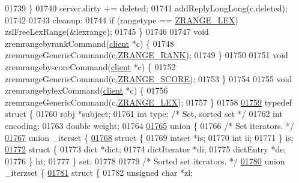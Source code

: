 \begin{DoxyCode}
01739     \}
01740     server.dirty += deleted;
01741     addReplyLongLong(c,deleted);
01742 
01743 cleanup:
01744     \textcolor{keywordflow}{if} (rangetype == \hyperlink{t__zset_8c_a74c64b6c3895c27dc16c15a3c4c590af}{ZRANGE\_LEX}) zslFreeLexRange(&lexrange);
01745 \}
01746 
01747 \textcolor{keywordtype}{void} zremrangebyrankCommand(\hyperlink{structclient}{client} *c) \{
01748     zremrangeGenericCommand(c,\hyperlink{t__zset_8c_a5efcb596b1e5f49647431b38c2c5dde3}{ZRANGE\_RANK});
01749 \}
01750 
01751 \textcolor{keywordtype}{void} zremrangebyscoreCommand(\hyperlink{structclient}{client} *c) \{
01752     zremrangeGenericCommand(c,\hyperlink{t__zset_8c_a0ca38ddc10a38a3b5f6b50e2b25fc4ce}{ZRANGE\_SCORE});
01753 \}
01754 
01755 \textcolor{keywordtype}{void} zremrangebylexCommand(\hyperlink{structclient}{client} *c) \{
01756     zremrangeGenericCommand(c,\hyperlink{t__zset_8c_a74c64b6c3895c27dc16c15a3c4c590af}{ZRANGE\_LEX});
01757 \}
01758 
\hyperlink{structzsetopsrc}{01759} \textcolor{keyword}{typedef} \textcolor{keyword}{struct} \{
01760     robj *subject;
01761     \textcolor{keywordtype}{int} type; \textcolor{comment}{/* Set, sorted set */}
01762     \textcolor{keywordtype}{int} encoding;
01763     \textcolor{keywordtype}{double} weight;
01764 
\hyperlink{unionzsetopsrc_8iter}{01765}     \textcolor{keyword}{union} \{
01766         \textcolor{comment}{/* Set iterators. */}
\hyperlink{unionzsetopsrc_1_1__iterset_8iter_8set}{01767}         \textcolor{keyword}{union} \_iterset \{
\hyperlink{structzsetopsrc_1_1__iterset_8iter_8set_8is}{01768}             \textcolor{keyword}{struct} \{
01769                 intset *is;
01770                 \textcolor{keywordtype}{int} ii;
01771             \} is;
\hyperlink{structzsetopsrc_1_1__iterset_8iter_8set_8ht}{01772}             \textcolor{keyword}{struct} \{
01773                 dict *dict;
01774                 dictIterator *di;
01775                 dictEntry *de;
01776             \} ht;
01777         \} set;
01778 
01779         \textcolor{comment}{/* Sorted set iterators. */}
\hyperlink{unionzsetopsrc_1_1__iterzset_8iter_8zset}{01780}         \textcolor{keyword}{union} \_iterzset \{
\hyperlink{structzsetopsrc_1_1__iterzset_8iter_8zset_8zl}{01781}             \textcolor{keyword}{struct} \{
01782                 \textcolor{keywordtype}{unsigned} \textcolor{keywordtype}{char} *zl;

\end{DoxyCode}
